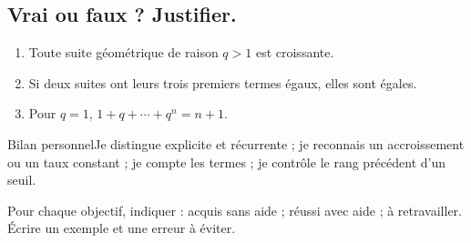 \subsection*{Vrai ou faux ? Justifier.}\label{C01-VF}
\begin{enumerate}
\item Toute suite géométrique de raison $q>1$ est croissante.
\item Si deux suites ont leurs trois premiers termes égaux, elles sont égales.
\item Pour $q=1$, $1+q+\cdots+q^n=n+1$.
\end{enumerate}
\begin{repere}{Bilan personnel}Je distingue explicite et récurrente ; je reconnais un accroissement ou un taux constant ; je compte les termes ; je contrôle le rang précédent d’un seuil.

Pour chaque objectif, indiquer : acquis sans aide ; réussi avec aide ; à retravailler. Écrire un exemple et une erreur à éviter.\end{repere}
\endgroup
\ifprof\fi
